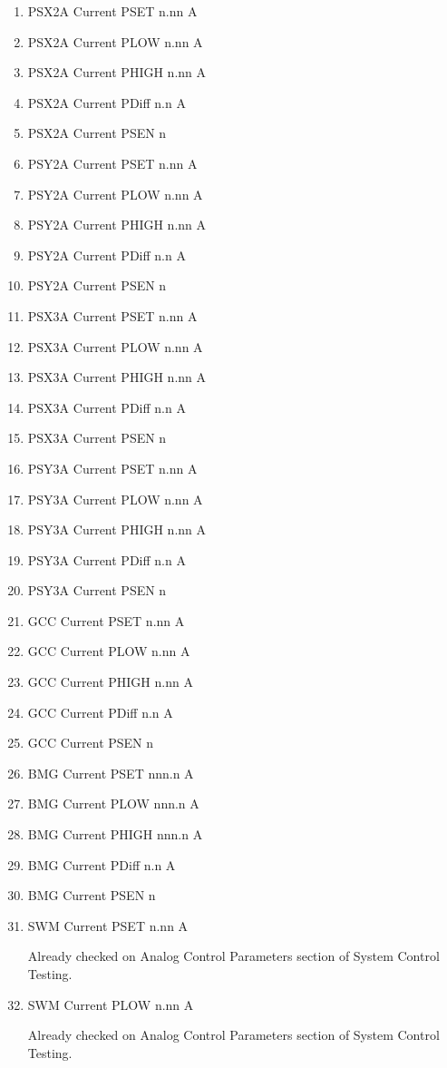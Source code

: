 \documentclass[11pt]{book}		%
\begin{document}
\begin{enumerate}
 \item PSX2A Current PSET  n.nn A
 \item PSX2A Current PLOW  n.nn A
 \item PSX2A Current PHIGH n.nn A
 \item PSX2A Current PDiff n.n A
 \item PSX2A Current PSEN  n
 \item PSY2A Current PSET  n.nn A
 \item PSY2A Current PLOW  n.nn A
 \item PSY2A Current PHIGH n.nn A
 \item PSY2A Current PDiff n.n A
 \item PSY2A Current PSEN  n
 \item PSX3A Current PSET  n.nn A
 \item PSX3A Current PLOW  n.nn A
 \item PSX3A Current PHIGH n.nn A
 \item PSX3A Current PDiff n.n A
 \item PSX3A Current PSEN  n
 \item PSY3A Current PSET  n.nn A
 \item PSY3A Current PLOW  n.nn A
 \item PSY3A Current PHIGH n.nn A
 \item PSY3A Current PDiff n.n A
 \item PSY3A Current PSEN  n
 \item GCC Current PSET  n.nn A
 \item GCC Current PLOW  n.nn A
 \item GCC Current PHIGH n.nn A
 \item GCC Current PDiff n.n A
 \item GCC Current PSEN  n
 \item BMG Current PSET  nnn.n A
 \item BMG Current PLOW  nnn.n A
 \item BMG Current PHIGH nnn.n A
 \item BMG Current PDiff n.n A
 \item BMG Current PSEN  n
 \item SWM Current PSET  n.nn A

\color{red}
Already checked on Analog Control Parameters section of System Control Testing.
\color{black}

 \item SWM Current PLOW  n.nn A

\color{red}
Already checked on Analog Control Parameters section of System Control Testing.
\color{black}


\end{enumerate}
\end{document}
